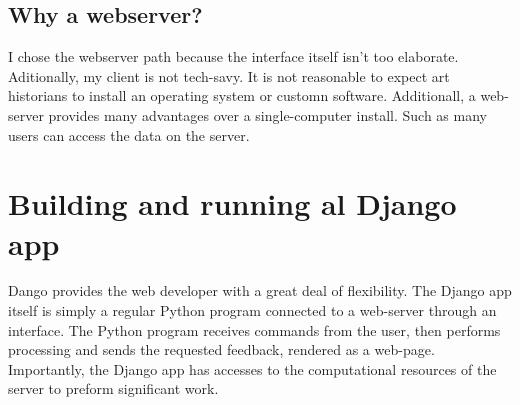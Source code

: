 \subsection{Why a webserver?}

I chose the webserver path because the interface itself isn't too elaborate.  Aditionally, my client is not tech-savy.  It is not reasonable to expect art historians to install an operating system or customn software.  Additionall, a web-server provides many advantages over a single-computer install.  Such as many users can access the data on the server.

\section{Building and running al Django app}

Dango provides the web developer with a great deal of flexibility.  The Django app itself is simply a regular Python program connected to a web-server through an interface.  The Python program receives commands from the user, then performs processing and sends the requested feedback, rendered as a web-page.  Importantly, the Django app has accesses to the computational resources of the server to preform significant work.



